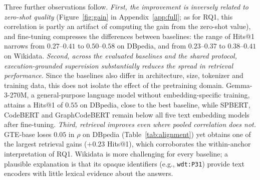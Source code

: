 \documentclass[runningheads]{llncs}
\begin{document}
Three further observations follow. \emph{First, the improvement is inversely
related to zero-shot quality} (Figure~\ref{fig:gain} in Appendix~\ref{app:full}; as for RQ1, this correlation is partly an artifact of
computing the gain from the zero-shot value), and fine-tuning compresses the
differences between baselines: the range of Hits@1 narrows from
$0.27$--$0.41$ to $0.50$--$0.58$ on DBpedia, and from $0.23$--$0.37$ to
$0.38$--$0.41$ on Wikidata. \emph{Second, across the evaluated baselines and the shared protocol,
execution-grounded supervision substantially reduces the spread in retrieval
performance.} Since the baselines also differ in architecture, size, tokenizer
and training data, this does not isolate the effect of the pretraining domain.
Gemma-3-270M, a general-purpose language model without
embedding-specific training, attains a Hits@1 of $0.55$ on DBpedia, close to
the best baseline, while SPBERT, CodeBERT and GraphCodeBERT remain below all
five text embedding models after fine-tuning. \emph{Third, retrieval improves
even where pooled correlation does not.} GTE-base loses $0.05$ in $\rho$ on
DBpedia (Table~\ref{tab:alignment}) yet obtains one of the largest retrieval
gains ($+0.23$ Hits@1), which corroborates the within-anchor interpretation of
RQ1. Wikidata is more challenging for every baseline; a plausible explanation
is that its opaque identifiers (e.g., \texttt{wdt:P31}) provide text encoders
with little lexical evidence about the answers.
\end{document}
